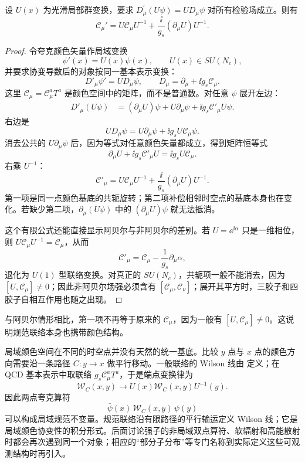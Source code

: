 \begin{proposition}[协变导数固定联络变换]
设 $U(x)$ 为光滑局部群变换，要求 $D_\mu^\prime(U\psi)=UD_\mu\psi$ 对所有检验场成立。则有
\begin{equation}
 {
 \mathscr C_\mu'
 =U\mathscr C_\mu U^{-1}
 +\frac{\ii}{g_s}(\partial_\mu U)U^{-1}.}
\label{eq:qcd-gauge-field-transformation-dp10}
\end{equation}
\end{proposition}
\begin{proof}
令夸克颜色矢量作局域变换
\[
\psi'(x)=U(x)\psi(x),
\qquad U(x)\in SU(N_c),
\]
并要求协变导数后的对象按同一基本表示变换：
\[
D'_\mu\psi'=U D_\mu\psi,
\qquad
D_\mu=\partial_\mu+\ii g_s\mathscr C_\mu.
\]
这里 $\mathscr C_\mu=\mathscr C_\mu^aT^a$ 是颜色空间中的矩阵，而不是普通数。对任意 $\psi$ 展开左边：
\begin{align*}
D'_\mu(U\psi)
&=(\partial_\mu U)\psi
+U\partial_\mu\psi
+\ii g_s\mathscr C'_\mu U\psi.
\end{align*}
右边是
\[
UD_\mu\psi
=U\partial_\mu\psi+\ii g_sU\mathscr C_\mu\psi.
\]
消去公共的 $U\partial_\mu\psi$ 后，因为等式对任意颜色矢量都成立，得到矩阵恒等式
\[
\partial_\mu U+\ii g_s\mathscr C'_\mu U
=\ii g_sU\mathscr C_\mu.
\]
右乘 $U^{-1}$：
\[
{
\mathscr C'_\mu
=U\mathscr C_\mu U^{-1}
+\frac{\ii}{g_s}(\partial_\mu U)U^{-1}.}
\]
第一项是同一点颜色基底的共轭旋转；第二项补偿相邻时空点的基底本身也在变化。若缺少第二项，$\partial_\mu(U\psi)$ 中的 $(\partial_\mu U)\psi$ 就无法抵消。

这个有限公式还能直接显示阿贝尔与非阿贝尔的差别。若 $U=\ee^{\ii\alpha}$ 只是一维相位，则 $U\mathscr C_\mu U^{-1}=\mathscr C_\mu$，从而
\[
\mathscr C'_\mu
=\mathscr C_\mu-\frac1{g_s}\partial_\mu\alpha,
\]
退化为 $U(1)$ 型联络变换。对真正的 $SU(N_c)$，共轭项一般不能消去，因为 $[U,\mathscr C_\mu]\neq0$；因此非阿贝尔场强必须含有 $[\mathscr C_\mu,\mathscr C_\nu]$；展开其平方时，三胶子和四胶子自相互作用也随之出现。
\end{proof}

与阿贝尔情形相比，第一项不再等于原来的 $\mathscr C_\mu$，因为一般有 $[U,\mathscr C_\mu]\neq0$。这说明规范联络本身也携带颜色结构。

局域颜色空间在不同的时空点并没有天然的统一基底。比较 $y$ 点与 $x$ 点的颜色方向需要沿一条路径 $C:y\to x$ 做平行移动。一般联络的 Wilson 线由 定义；在 QCD 基本表示中取联络 $g_s\mathscr C_\mu^aT^a$，于是端点变换律为
\begin{equation*}
 \mathcal W_C(x,y)\longrightarrow
 U(x)\mathcal W_C(x,y)U^{-1}(y).
\end{equation*}
因此两点夸克算符
\begin{equation*}
 \bar\psi(x)\,\mathcal W_C(x,y)\,\psi(y)
\end{equation*}
可以构成局域规范不变量。规范联络沿有限路径的平行输运定义 Wilson 线；它是局域颜色协变性的积分形式。后面讨论强子的非局域双点算符、软辐射和高能散射时都会再次遇到同一个对象；相应的“部分子分布”等专门名称到实际定义这些可观测结构时再引入。

